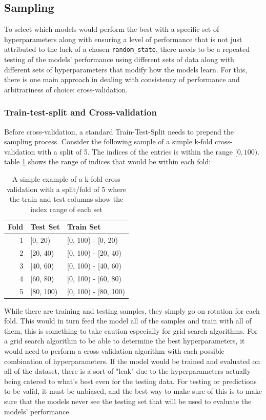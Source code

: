 \subsection{Sampling}

To select which models would perform the best with a specific set of hyperparameters along with ensuring a level of performance that is not just attributed to the luck of a chosen \texttt{random\_state}, there needs to be a repeated testing of the models' performance using different sets of data along with different sets of hyperparameters that modify how the models learn. For this, there is one main approach in dealing with consistency of performance and arbitrariness of choice: cross-validation.

\subsubsection{Train-test-split and Cross-validation}

Before cross-validation, a standard Train-Test-Split needs to prepend the sampling process. Consider the following sample of a simple k-fold cross-validation with a split of 5. The indices of the entries is within the range $[0, 100)$. table \ref{tab:kfold} shows the range of indices that would be within each fold:

\begin{table}[H]
    \caption{A simple example of a k-fold cross validation with a split/fold of 5 where the train and test columns show the index range of each set}
    \label{tab:kfold}
    \begin{tabularx}{\linewidth}{r|>{\centering}X>{\centering\arraybackslash}X}
        \toprule
        Fold & Test Set & Train Set\\
        \midrule
        1 & [0, 20) & [0, 100) - [0, 20)\\
        2 & [20, 40) & [0, 100) - [20, 40)\\
        3 & [40, 60) & [0, 100) - [40, 60)\\
        4 & [60, 80) & [0, 100) - [60, 80)\\
        5 & [80, 100) & [0, 100) - [80, 100)\\
        \bottomrule
    \end{tabularx}
\end{table}

While there are training and testing samples, they simply go on rotation for each fold. This would in turn feed the model all of the samples and train with all of them, this is something to take caution especially for grid search algorithms. For a grid search algorithm to be able to determine the best hyperparameters, it would need to perform a cross validation algorithm with each possible combination of hyperparameters. If the model would be trained and evaluated on all of the dataset, there is a sort of "leak" due to the hyperparameters actually being catered to what's best even for the testing data. For testing or predictions to be valid, it must be unbiased, and the best way to make sure of this is to make sure that the models never see the testing set that will be used to evaluate the models' performance. 

